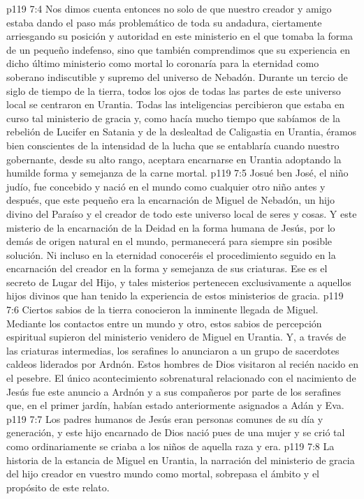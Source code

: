 \vs p119 7:4 Nos dimos cuenta entonces no solo de que nuestro creador y amigo estaba dando el paso más problemático de toda su andadura, ciertamente arriesgando su posición y autoridad en este ministerio en el que tomaba la forma de un pequeño indefenso, sino que también comprendimos que su experiencia en dicho último ministerio como mortal lo coronaría para la eternidad como soberano indiscutible y supremo del universo de Nebadón. Durante un tercio de siglo de tiempo de la tierra, todos los ojos de todas las partes de este universo local se centraron en Urantia. Todas las inteligencias percibieron que estaba en curso tal ministerio de gracia y, como hacía mucho tiempo que sabíamos de la rebelión de Lucifer en Satania y de la deslealtad de Caligastia en Urantia, éramos bien conscientes de la intensidad de la lucha que se entablaría cuando nuestro gobernante, desde su alto rango, aceptara encarnarse en Urantia adoptando la humilde forma y semejanza de la carne mortal.
\vs p119 7:5 Josué ben José, el niño judío, fue concebido y nació en el mundo como cualquier otro niño antes y después,  que este pequeño era la encarnación de Miguel de Nebadón, un hijo divino del Paraíso y el creador de todo este universo local de seres y cosas. Y este misterio de la encarnación de la Deidad en la forma humana de Jesús, por lo demás de origen natural en el mundo, permanecerá para siempre sin posible solución. Ni incluso en la eternidad conoceréis el procedimiento seguido en la encarnación del creador en la forma y semejanza de sus criaturas. Ese es el secreto de Lugar del Hijo, y tales misterios pertenecen exclusivamente a aquellos hijos divinos que han tenido la experiencia de estos ministerios de gracia.
\vs p119 7:6 Ciertos sabios de la tierra conocieron la inminente llegada de Miguel. Mediante los contactos entre un mundo y otro, estos sabios de percepción espiritual supieron del ministerio venidero de Miguel en Urantia. Y, a través de las criaturas intermedias, los serafines lo anunciaron a un grupo de sacerdotes caldeos liderados por Ardnón. Estos hombres de Dios visitaron al recién nacido en el pesebre. El único acontecimiento sobrenatural relacionado con el nacimiento de Jesús fue este anuncio a Ardnón y a sus compañeros por parte de los serafines que, en el primer jardín, habían estado anteriormente asignados a Adán y Eva.
\vs p119 7:7 Los padres humanos de Jesús eran personas comunes de su día y generación, y este hijo encarnado de Dios nació pues de una mujer y se crió tal como ordinariamente se criaba a los niños de aquella raza y era.
\vs p119 7:8 \pc La historia de la estancia de Miguel en Urantia, la narración del ministerio de gracia del hijo creador en vuestro mundo como mortal, sobrepasa el ámbito y el propósito de este relato.
